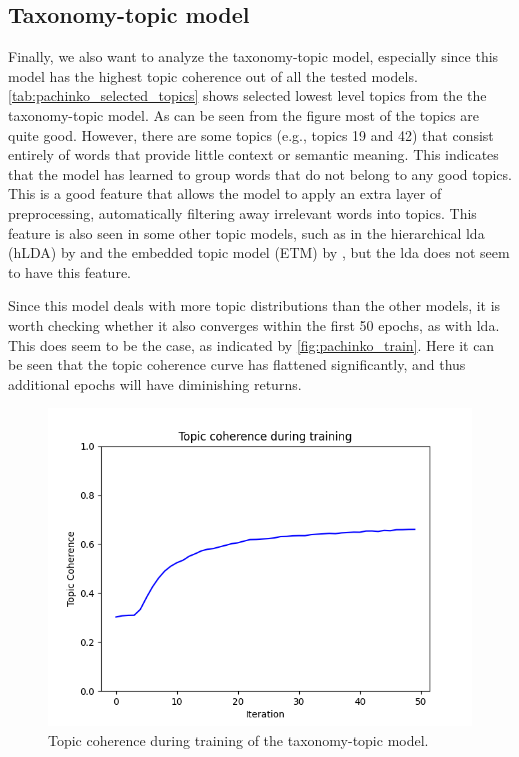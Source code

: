 \subsection{Taxonomy-topic model}\label{sec:taxonomy_analysis}
Finally, we also want to analyze the taxonomy-topic model, especially since this model has the highest topic coherence out of all the tested models.
\autoref{tab:pachinko_selected_topics} shows selected lowest level topics from the the taxonomy-topic model.
As can be seen from the figure most of the topics are quite good. 
However, there are some topics (e.g., topics 19 and 42) that consist entirely of words that provide little context or semantic meaning.
This indicates that the model has learned to group words that do not belong to any good topics.
This is a good feature that allows the model to apply an extra layer of preprocessing, automatically filtering away irrelevant words into topics.
This feature is also seen in some other topic models, such as in the hierarchical \gls{lda} (hLDA) by \citet{hLDA2004} and the embedded topic model (ETM) by \citet{dieng2020topic}, but the \gls{lda} does not seem to have this feature.

Since this model deals with more topic distributions than the other models, it is worth checking whether it also converges within the first 50 epochs, as with \gls{lda}.
This does seem to be the case, as indicated by \autoref{fig:pachinko_train}.
Here it can be seen that the topic coherence curve has flattened significantly, and thus additional epochs will have diminishing returns.

\begin{figure}
	\centering
	\includegraphics[width= \linewidth]{figures/pachinko_training.PNG}
	\caption{Topic coherence during training of the taxonomy-topic model.}
	\label{fig:pachinko_train}
\end{figure}

